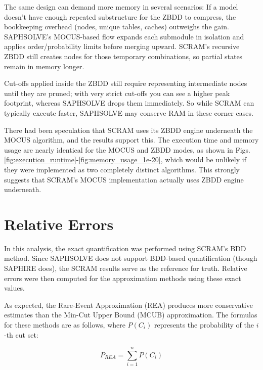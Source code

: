

The same design can demand more memory in several scenarios:
If a model doesn’t have enough repeated substructure for the ZBDD to compress, the bookkeeping overhead (nodes, unique tables, caches) outweighs the gain.
SAPHSOLVE’s MOCUS-based flow expands each submodule in isolation and applies order/probability limits before merging upward. SCRAM’s recursive ZBDD still creates nodes for those temporary combinations, so partial states remain in memory longer.





Cut-offs applied inside the ZBDD still require representing intermediate nodes until they are pruned; with very strict cut-offs you can see a higher peak footprint, whereas SAPHSOLVE drops them immediately.
So while SCRAM can typically execute faster, SAPHSOLVE may conserve RAM in these corner cases.

There had been speculation that SCRAM uses its ZBDD engine underneath the MOCUS algorithm, and the results support this. The execution time and memory usage are nearly identical for the MOCUS and ZBDD modes, as shown in Figs. \ref{fig:execution_runtime}-\ref{fig:memory_usage_1e-20}, which would be unlikely if they were implemented as two completely distinct algorithms. This strongly suggests that SCRAM’s MOCUS implementation actually uses ZBDD engine underneath.

\section{Relative Errors}
In this analysis, the exact quantification was performed using SCRAM’s BDD method. Since SAPHSOLVE does not support BDD-based quantification (though SAPHIRE does), the SCRAM results serve as the reference for truth. Relative errors were then computed for the approximation methods using these exact values.



As expected, the Rare-Event Approximation (REA) produces more conservative estimates than the Min-Cut Upper Bound (MCUB) approximation. The formulas for these methods are as follows, where $P(C_i)$ represents the probability of the $i$-th cut set:

\begin{equation}
    P_{REA} = \sum_{i=1}^{n} P(C_i)
\end{equation}

